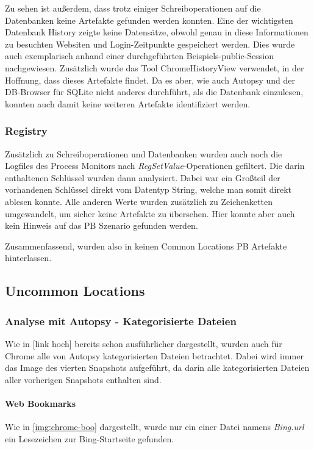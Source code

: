 \begin{appendices}
Zu sehen ist außerdem, dass trotz einiger Schreiboperationen auf die Datenbanken keine Artefakte gefunden werden konnten. Eine der wichtigsten Datenbank \glqq{}History\grqq{} zeigte keine Datensätze, obwohl genau in diese Informationen zu besuchten Websiten und Login-Zeitpunkte gespeichert werden. Dies wurde auch exemplarisch anhand einer durchgeführten Beispiels-public-Session nachgewiesen. Zusätzlich wurde das Tool \glqq{}ChromeHistoryView\grqq{} verwendet, in der Hoffnung, dass dieses Artefakte findet. Da es aber, wie auch Autopsy und der DB-Browser für SQLite nicht anderes durchführt, als die Datenbank einzulesen, konnten auch damit keine weiteren Artefakte identifiziert werden.

\subsubsection*{Registry}

Zusätzlich zu Schreiboperationen und Datenbanken wurden auch noch die Logfiles des Process Monitors nach \textit{RegSetValue}-Operationen gefiltert. Die darin enthaltenen Schlüssel wurden dann analysiert. Dabei war ein Großteil der vorhandenen Schlüssel direkt vom Datentyp String, welche man somit direkt ablesen konnte. Alle anderen Werte wurden zusätzlich zu Zeichenketten umgewandelt, um sicher keine Artefakte zu übersehen. Hier konnte aber auch kein Hinweis auf das PB Szenario gefunden werden. 

Zusammenfassend, wurden also in keinen Common Locations PB Artefakte hinterlassen.

\subsection*{Uncommon Locations}

\subsubsection*{Analyse mit Autopsy - Kategorisierte Dateien}

Wie in [link hoch] bereits schon ausführlicher dargestellt, wurden auch für Chrome alle von Autopsy kategorisierten Dateien betrachtet. Dabei wird immer das Image des vierten Snapshots aufgeführt, da darin alle kategorisierten Dateien aller vorherigen Snapshots enthalten sind.

\paragraph{Web Bookmarks}
Wie in \autoref{img:chrome-boo} dargestellt, wurde nur ein einer Datei namens \textit{Bing.url} ein Lesezeichen zur Bing-Startseite gefunden.


\end{appendices}
